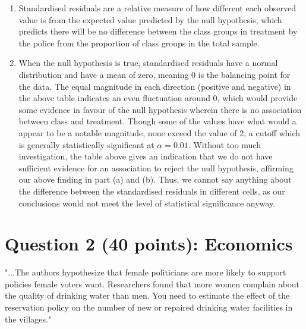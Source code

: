 \documentclass[12pt,letterpaper]{article}
\begin{document}
\begin{enumerate}
	\item[] Standardised residuals are a relative measure of how different each observed value is from the expected value predicted by the null hypothesis, which predicts there will be no difference between the class groups in treatment by the police from the proportion of class groups in the total sample. 
	\item [] When the null hypothesis is true, standardised residuals have a normal distribution and have a mean of zero, meaning 0 is the balancing point for the data. The equal magnitude in each direction (positive and negative) in the above table indicates an even fluctuation around 0, which would provide some evidence in favour of the null hypothesis wherein there is no association between class and treatment. Though some of the values have what would a appear to be a notable magnitude, none exceed the value of 2, a cutoff which is generally statistically significant at $\alpha = 0.01$. Without too much investigation, the table above gives an indication that we do not have sufficient evidence for an association to reject the null hypothesis, affirming our above finding in part (a) and (b). Thus, we cannot say anything about the difference between the standardised residuals in different cells, as our conclusions would not meet the level of statistical significance anyway. 
	
\end{enumerate}
\newpage

\section*{Question 2 (40 points): Economics}
"...The authors hypothesize that female politicians are more likely to support policies female voters want. Researchers found that more women complain about the quality of drinking water than men. You need to estimate the effect of the reservation policy on the number of new or repaired drinking water facilities in the villages."
\vspace{.5cm}
\end{document}
